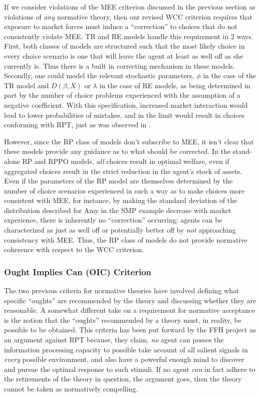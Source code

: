 \documentclass[11pt,a4paper]{article}
\begin{document}
If we consider violations of the MEE criterion discussed in the previous section as violations of \textit{any} normative theory, then our revised WCC criterion requires that exposure to market forces must induce a \enquote{correction} to choices that do not consistently violate MEE.
TR and RE models handle this requirement in 2 ways. 
First, both classes of models are structured such that the most likely choice in every choice scenario is one that will leave the agent at least as well off as she currently is.
Thus there is a built in correcting mechanism in these models.
Secondly, one could model the relevant stochastic parameters, $\phi$ in the case of the TR model and $D(\beta,X)$ or $\lambda$ in the case of RE models, as being determined in part by the number of choice problems experienced with the assumption of a negative coefficient.
With this specification, increased market interaction would lead to lower probabilities of mistakes, and in the limit would result in choices conforming with RPT, just as was observed in \textcite{Chu1990}.

However, since the RP class of models don't subscribe to MEE, it isn't clear that these models provide any guidance as to what should be corrected.
In the stand-alone RP and RPPO models, \textit{all} choices result in optimal welfare, even if aggregated choices result in the strict reduction in the agent's stock of assets.
Even if the parameters of the RP model are themselves determined by the number of choice scenarios experienced in such a way as to make choices more consistent with MEE, for instance, by making the standard deviation of the distribution described for Amy in the SMP example decrease with market experience, there is inherently no \enquote{correction} occurring;
agents can be characterized as just as well off or potentially better off by \textit{not} approaching consistency with MEE.
Thus, the RP class of models do not provide normative coherence with respect to the WCC criterion.

\subsubsection{Ought Implies Can (OIC) Criterion}

The two previous criteria for normative theories have involved defining what specific \enquote{oughts} are recommended by the theory and discussing whether they are reasonable.
A somewhat different take on a requirement for normative acceptance is the notion that the \enquote{oughts} recommended by a theory must, in reality, be possible to be obtained.
This criteria has been put forward by the FFH project as an argument against RPT because, they claim, \textit{no} agent can posses the information processing capacity to possible take account of all salient signals in \textit{every} possible environment, and also have a powerful enough mind to discover and pursue the optimal response to such stimuli.
If no agent \textit{can} in fact adhere to the retirements of the theory in question, the argument goes, then the theory cannot be taken as normatively compelling.
\end{document}

